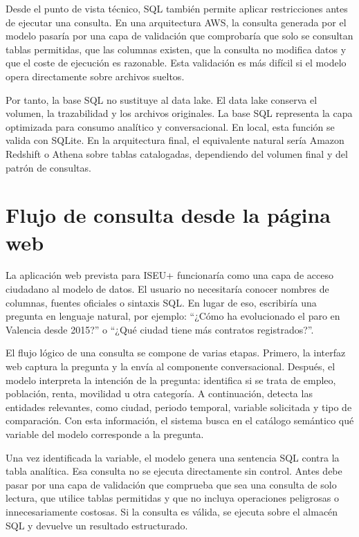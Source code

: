 Desde el punto de vista técnico, SQL también permite aplicar restricciones antes de ejecutar una consulta. En una arquitectura AWS, la consulta generada por el modelo pasaría por una capa de validación que comprobaría que solo se consultan tablas permitidas, que las columnas existen, que la consulta no modifica datos y que el coste de ejecución es razonable. Esta validación es más difícil si el modelo opera directamente sobre archivos sueltos.

Por tanto, la base SQL no sustituye al data lake. El data lake conserva el volumen, la trazabilidad y los archivos originales. La base SQL representa la capa optimizada para consumo analítico y conversacional. En local, esta función se valida con SQLite. En la arquitectura final, el equivalente natural sería Amazon Redshift o Athena sobre tablas catalogadas, dependiendo del volumen final y del patrón de consultas.

\section{Flujo de consulta desde la página web}

La aplicación web prevista para ISEU+ funcionaría como una capa de acceso ciudadano al modelo de datos. El usuario no necesitaría conocer nombres de columnas, fuentes oficiales o sintaxis SQL. En lugar de eso, escribiría una pregunta en lenguaje natural, por ejemplo: ``¿Cómo ha evolucionado el paro en Valencia desde 2015?'' o ``¿Qué ciudad tiene más contratos registrados?''.

El flujo lógico de una consulta se compone de varias etapas. Primero, la interfaz web captura la pregunta y la envía al componente conversacional. Después, el modelo interpreta la intención de la pregunta: identifica si se trata de empleo, población, renta, movilidad u otra categoría. A continuación, detecta las entidades relevantes, como ciudad, periodo temporal, variable solicitada y tipo de comparación. Con esta información, el sistema busca en el catálogo semántico qué variable del modelo corresponde a la pregunta.

Una vez identificada la variable, el modelo genera una sentencia SQL contra la tabla analítica. Esa consulta no se ejecuta directamente sin control. Antes debe pasar por una capa de validación que comprueba que sea una consulta de solo lectura, que utilice tablas permitidas y que no incluya operaciones peligrosas o innecesariamente costosas. Si la consulta es válida, se ejecuta sobre el almacén SQL y devuelve un resultado estructurado.

